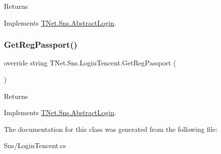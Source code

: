 \begin{DoxyReturn}{Returns}

\end{DoxyReturn}


Implements \mbox{\hyperlink{class_t_net_1_1_sns_1_1_abstract_login_a6b5dac3d6d46efb7b1e4049e674105e5}{T\+Net.\+Sns.\+Abstract\+Login}}.

\mbox{\label{class_t_net_1_1_sns_1_1_login_tencent_abc09c476353f85c5e8a135d235bcb5c6}} 
\subsubsection{\texorpdfstring{Get\+Reg\+Passport()}{GetRegPassport()}}
{\footnotesize\ttfamily override string T\+Net.\+Sns.\+Login\+Tencent.\+Get\+Reg\+Passport (\begin{DoxyParamCaption}{ }\end{DoxyParamCaption})\hspace{0.3cm}{\ttfamily [virtual]}}





\begin{DoxyReturn}{Returns}

\end{DoxyReturn}


Implements \mbox{\hyperlink{class_t_net_1_1_sns_1_1_abstract_login_a3930eb564bb4804e1b646d749f20907a}{T\+Net.\+Sns.\+Abstract\+Login}}.



The documentation for this class was generated from the following file\+:\begin{DoxyCompactItemize}
\item 
Sns/Login\+Tencent.\+cs\end{DoxyCompactItemize}
